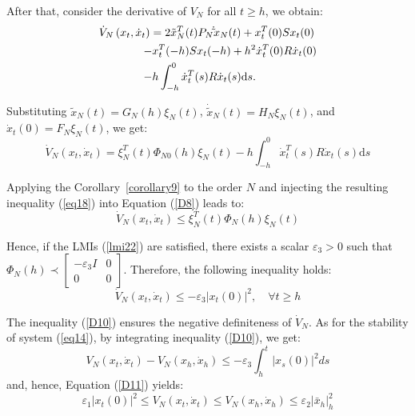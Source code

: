 \documentclass[a4paper]{cas-sc}
\begin{document}
After that, consider the derivative of $V_N$ for all $t \geqslant h$, we obtain:
\begin{equation}
  \begin{gathered}
    {{\dot V}_N}\left( {{x_t},{{\dot x}_t}} \right) = 2\tilde x_N^T(t){P_N}{{\dot \tilde x}_N}(t) + x_t^T(0)S{x_t}(0) \hfill \\
    \quad \quad \quad \quad  - x_t^T( - h)S{x_t}( - h) + {h^2}\dot x_t^T(0)R{{\dot x}_t}(0) \hfill \\
    \quad \quad \quad \quad  - h\int_{ - h}^0 {\dot x_t^T} (s)R{{\dot x}_t}(s){\text{d}}s. \hfill \\
  \end{gathered}
  \label{D7}
\end{equation}

Substituting ${\tilde x_N}(t) = {G_N}(h){\xi _N}(t)$, ${\dot {\tilde x}_N}(t) = {H_N}{\xi _N}(t)$, and ${\dot x_t}\left( 0 \right) = {F_N}{\xi _N}(t)$, we get:
\begin{equation}
  {\dot V_N}\left( {{x_t},{{\dot x}_t}} \right) = \xi _N^T(t){\Phi _{N0}}(h){\xi _N}(t) - h\int_{ - h}^0 {\dot x_t^T} (s)R{\dot x_t}(s){\text{d}}s
  \label{D8}
\end{equation}

Applying the Corollary~\ref{corollary9} to the order $N$ and injecting the resulting inequality (\ref{eq18}) into Equation (\ref{D8}) leads to:
\begin{equation}
  {\dot V_N}\left( {{x_t},{{\dot x}_t}} \right) \leqslant \xi _N^T(t){\Phi _N}(h){\xi _N}(t)
  \label{D9}
\end{equation}

Hence, if the LMIs (\ref{lmi22}) are satisfied, there exists a scalar ${\varepsilon _3} > 0$ such that ${\Phi _N}(h) \prec \left[ {\begin{array}{*{20}{c}}
          { - {\varepsilon _3}I} & 0 \\
          0                      & 0
        \end{array}} \right]$. Therefore, the following inequality holds:
\begin{equation}
  {\dot V_N}\left( {{x_t},{{\dot x}_t}} \right) \leqslant  - {\varepsilon _3}{\left| {{x_t}(0)} \right|^2},\quad \forall t \geqslant h
  \label{D10}
\end{equation}

The inequality (\ref{D10}) ensures the negative definiteness of ${\dot V_N}$. As for the stability of system (\ref{eq14}), by integrating inequality (\ref{D10}), we get:
\begin{equation}
  {V_N}\left( {{x_t},{{\dot x}_t}} \right) - {V_N}\left( {{x_h},{{\dot x}_h}} \right) \leqslant  - {\varepsilon _3}\int_h^t {{{\left| {{x_s}(0)} \right|}^2}} ds
  \label{D11}
\end{equation}
and, hence, Equation (\ref{D11}) yields:
\begin{equation}
  {\varepsilon _1}{\left| {{x_t}(0)} \right|^2} \leqslant {V_N}\left( {{x_t},{{\dot x}_t}} \right) \leqslant {V_N}\left( {{x_h},{{\dot x}_h}} \right) \leqslant {\varepsilon _2}\left| {{{\bar x}_h}} \right|_h^2
  \label{D12}
\end{equation}
\end{document}
